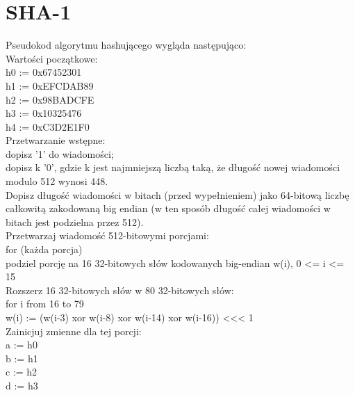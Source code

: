 \documentclass[oneside]{mgr}
\begin{document}
\chapter{SHA-1}
Pseudokod algorytmu hashującego wygląda następująco:\\
Wartości początkowe:\\
\hspace*{10mm}h0 := 0x67452301\\
\hspace*{10mm}h1 := 0xEFCDAB89\\
\hspace*{10mm}h2 := 0x98BADCFE\\
\hspace*{10mm}h3 := 0x10325476\\
\hspace*{10mm}h4 := 0xC3D2E1F0\\
Przetwarzanie wstępne:\\
dopisz '1' do wiadomości;\\
dopisz k '0', gdzie k jest najmniejszą liczbą taką, że długość nowej wiadomości modulo 512 wynosi 448.\\
Dopisz długość wiadomości w bitach (przed wypełnieniem) jako 64-bitową liczbę całkowitą zakodowaną big endian (w ten sposób długość całej wiadomości w bitach jest podzielna przez 512).\\
Przetwarzaj wiadomość 512-bitowymi porcjami:\\
for (każda porcja)\\
\hspace*{10mm}podziel porcję na 16 32-bitowych słów kodowanych big-endian w(i), 0 <= i <= 15\\
\hspace*{10mm}Rozszerz 16 32-bitowych słów w 80 32-bitowych słów:\\
\hspace*{10mm}for i from 16 to 79\\
\hspace*{20mm}w(i) := (w(i-3) xor w(i-8) xor w(i-14) xor w(i-16)) <<< 1\\
\hspace*{10mm}Zainicjuj zmienne dla tej porcji:\\
\hspace*{10mm}a := h0\\
\hspace*{10mm}b := h1\\
\hspace*{10mm}c := h2\\
\hspace*{10mm}d := h3\\
\end{document}
